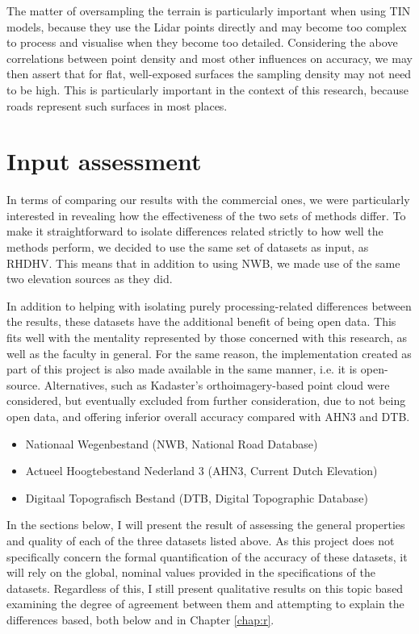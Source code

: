 The matter of oversampling the terrain is particularly important when using TIN models, because they use the Lidar points directly and may become too complex to process and visualise when they become too detailed. Considering the above correlations between point density and most other influences on accuracy, we may then assert that for flat, well-exposed surfaces the sampling density may not need to be high. This is particularly important in the context of this research, because roads represent such surfaces in most places.

\section{Input assessment}
\label{sec:input}

In terms of comparing our results with the commercial ones, we were particularly interested in revealing how the effectiveness of the two sets of methods differ. To make it straightforward to isolate differences related strictly to how well the methods perform, we decided to use the same set of datasets as input, as RHDHV. This means that in addition to using NWB, we made use of the same two elevation sources as they did.

In addition to helping with isolating purely processing-related differences between the results, these datasets have the additional benefit of being open data. This fits well with the mentality represented by those concerned with this research, as well as the faculty in general. For the same reason, the implementation created as part of this project is also made available in the same manner, i.e. it is open-source. Alternatives, such as Kadaster's orthoimagery-based point cloud were considered, but eventually excluded from further consideration, due to not being open data, and offering inferior overall accuracy compared with AHN3 and DTB.

\begin{itemize}
\item Nationaal Wegenbestand (NWB, National Road Database)
\item Actueel Hoogtebestand Nederland 3 (AHN3, Current Dutch Elevation)
\item Digitaal Topografisch Bestand (DTB, Digital Topographic Database)
\end{itemize}

In the sections below, I will present the result of assessing the general properties and quality of each of the three datasets listed above. As this project does not specifically concern the formal quantification of the accuracy of these datasets, it will rely on the global, nominal values provided in the specifications of the datasets. Regardless of this, I still present qualitative results on this topic based examining the degree of agreement between them and attempting to explain the differences based, both below and in Chapter \ref{chap:r}.

